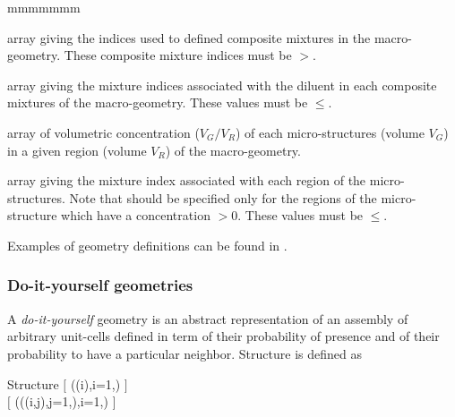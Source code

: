 \begin{ListeDeDescription}{mmmmmmm}
\item[\dusa{milie}] array giving the indices used to defined composite mixtures in the macro-geometry. These composite mixture indices must be $>$.

\item[\dusa{mixdil}] array giving the mixture indices associated with the diluent in each composite mixtures of the macro-geometry.  These values must be $\le$.

\item[\dusa{fract}] array of volumetric concentration ($V_{G}/V_{R}$) of
each micro-structures (volume $V_{G}$) in a given region (volume $V_{R}$) of the
macro-geometry.  

\item[\dusa{mixgr}] array giving the mixture index associated with each
region of the micro-structures. Note that  should be specified only
for the regions of the micro-structure which have a concentration
$>$0. These values must be $\le$.

\end{ListeDeDescription}

Examples of geometry definitions can be found in .

\subsubsection{Do-it-yourself geometries}\label{sect:descSIJ}

A {\sl do-it-yourself} geometry is an abstract representation of an assembly of arbitrary unit-cells defined in term of their probability of presence and of their probability to have a particular neighbor. Structure  is defined as

\begin{DataStructure}{Structure }
$[$  ((i),i=1,) $]$\\
$[$  (((i,j),j=1,),i=1,) $]$
\end{DataStructure}


